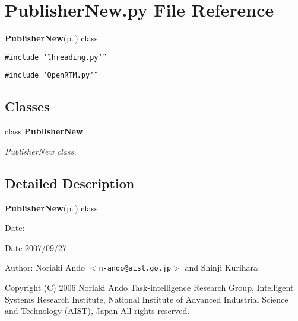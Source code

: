 \section{Publisher\-New.py File Reference}
\label{PublisherNew_8py}
{\bf Publisher\-New}{\rm (p.\,\pageref{classPublisherNew})} class. 

{\tt \#include \char`\"{}threading.py\char`\"{}}\par
{\tt \#include \char`\"{}Open\-RTM.py\char`\"{}}\par
\subsection*{Classes}
\begin{CompactItemize}
\item 
class {\bf Publisher\-New}
\begin{CompactList}\small\item\em Publisher\-New class. \item\end{CompactList}\end{CompactItemize}


\subsection{Detailed Description}
{\bf Publisher\-New}{\rm (p.\,\pageref{classPublisherNew})} class. 

\begin{Desc}
\item[Date:]\begin{Desc}
\item[Date]2007/09/27 \end{Desc}
\end{Desc}
\begin{Desc}
\item[Author:]Noriaki Ando $<${\tt n-ando@aist.go.jp}$>$ and Shinji Kurihara\end{Desc}
Copyright (C) 2006 Noriaki Ando Task-intelligence Research Group, Intelligent Systems Research Institute, National Institute of Advanced Industrial Science and Technology (AIST), Japan All rights reserved.